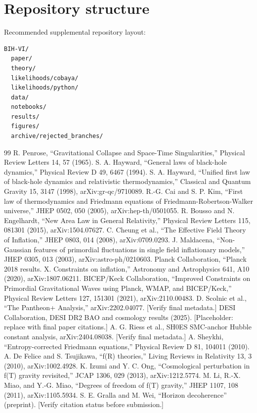 \documentclass[11pt]{article}
\begin{document}
\section{Repository structure}
Recommended supplemental repository layout:
\begin{verbatim}
BIH-VI/
  paper/
  theory/
  likelihoods/cobaya/
  likelihoods/python/
  data/
  notebooks/
  results/
  figures/
  archive/rejected_branches/
\end{verbatim}


\begin{thebibliography}{99}
 R. Penrose, ``Gravitational Collapse and Space-Time Singularities,'' Physical Review Letters 14, 57 (1965).
 S. A. Hayward, ``General laws of black-hole dynamics,'' Physical Review D 49, 6467 (1994).
 S. A. Hayward, ``Unified first law of black-hole dynamics and relativistic thermodynamics,'' Classical and Quantum Gravity 15, 3147 (1998), arXiv:gr-qc/9710089.
 R.-G. Cai and S. P. Kim, ``First law of thermodynamics and Friedmann equations of Friedmann-Robertson-Walker universe,'' JHEP 0502, 050 (2005), arXiv:hep-th/0501055.
 R. Bousso and N. Engelhardt, ``New Area Law in General Relativity,'' Physical Review Letters 115, 081301 (2015), arXiv:1504.07627.
 C. Cheung et al., ``The Effective Field Theory of Inflation,'' JHEP 0803, 014 (2008), arXiv:0709.0293.
 J. Maldacena, ``Non-Gaussian features of primordial fluctuations in single field inflationary models,'' JHEP 0305, 013 (2003), arXiv:astro-ph/0210603.
 Planck Collaboration, ``Planck 2018 results. X. Constraints on inflation,'' Astronomy and Astrophysics 641, A10 (2020), arXiv:1807.06211.
 BICEP/Keck Collaboration, ``Improved Constraints on Primordial Gravitational Waves using Planck, WMAP, and BICEP/Keck,'' Physical Review Letters 127, 151301 (2021), arXiv:2110.00483.
 D. Scolnic et al., ``The Pantheon+ Analysis,'' arXiv:2202.04077. [Verify final metadata.]
 DESI Collaboration, DESI DR2 BAO and cosmology results (2025). [Placeholder: replace with final paper citations.]
 A. G. Riess et al., SH0ES SMC-anchor Hubble constant analysis, arXiv:2404.08038. [Verify final metadata.]
 A. Sheykhi, ``Entropy-corrected Friedmann equations,'' Physical Review D 81, 104011 (2010).
 A. De Felice and S. Tsujikawa, ``f(R) theories,'' Living Reviews in Relativity 13, 3 (2010), arXiv:1002.4928.
 K. Izumi and Y. C. Ong, ``Cosmological perturbation in f(T) gravity revisited,'' JCAP 1306, 029 (2013), arXiv:1212.5774.
 M. Li, R.-X. Miao, and Y.-G. Miao, ``Degrees of freedom of f(T) gravity,'' JHEP 1107, 108 (2011), arXiv:1105.5934.
 S. E. Gralla and M. Wei, ``Horizon decoherence'' (preprint). [Verify citation status before submission.]
\end{thebibliography}
\end{document}
